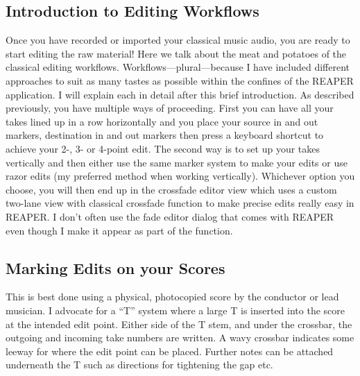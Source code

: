 \documentclass[10pt,american]{article}
\begin{document}
\subsection{Introduction to Editing Workflows}

Once you have recorded or imported your classical music audio, you are ready to
start editing the raw material! Here we talk about the meat and potatoes of the
classical editing workflows. Workflows---plural---because I have included
different approaches to suit as many tastes as possible within the confines of
the REAPER application. I will explain each in detail after this brief
introduction. As described previously, you have multiple ways of proceeding.
First you can have all your takes lined up in a row horizontally and you place
your source in and out markers, destination in and out markers then press a
keyboard shortcut to achieve your 2-, 3- or 4-point edit. The second way is to
set up your takes vertically and then either use the same marker system to make
your edits or use razor edits (my preferred method when working vertically).
Whichever option you choose, you will then end up in the crossfade editor view
which uses a custom two-lane view with classical crossfade function to make
precise edits really easy in REAPER. I don't often use the fade editor dialog
that comes with REAPER even though I make it appear as part of the function.

\subsection{Marking Edits on your Scores}

This is best done using a physical, photocopied score by the conductor or lead
musician. I advocate for a \textquotedblleft T\textquotedblright{} system where
a large T is inserted into the score at the intended edit point. Either side of
the T stem, and under the crossbar, the outgoing and incoming take numbers are
written. A wavy crossbar indicates some leeway for where the edit point can be
placed. Further notes can be attached underneath the T such as directions for
tightening the gap etc.
\end{document}
